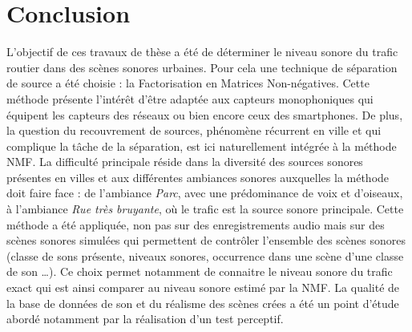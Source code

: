 \chapter*{Conclusion}
\label{chap:intro}



L'objectif de ces travaux de thèse a été de déterminer le niveau sonore du trafic routier dans des scènes sonores urbaines. Pour cela une technique de séparation de source a été choisie : la Factorisation en Matrices Non-négatives.
Cette méthode présente l'intérêt d'être adaptée aux capteurs monophoniques qui équipent les capteurs des réseaux ou bien encore ceux des smartphones. De plus, la question du recouvrement de sources, phénomène récurrent en ville et qui complique la tâche de la séparation, est ici naturellement intégrée à la méthode NMF. 
La difficulté principale réside dans la diversité des sources sonores présentes en villes et aux différentes ambiances sonores auxquelles la méthode doit faire face : de l'ambiance \textit{Parc}, avec une prédominance de voix et d'oiseaux, à l'ambiance \textit{Rue très bruyante}, où le trafic est la source sonore principale.
Cette méthode a été appliquée, non pas sur des enregistrements audio mais sur des scènes sonores simulées qui permettent de contrôler l'ensemble des scènes sonores (classe de sons présente, niveaux sonores, occurrence dans une scène d'une classe de son \dots). Ce choix permet notamment de connaitre le niveau sonore du trafic exact qui est ainsi comparer au niveau sonore estimé par la NMF. La qualité de la base de données de son et du réalisme des scènes crées a été un point d'étude abordé notamment par la réalisation d'un test perceptif. 




